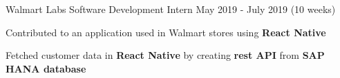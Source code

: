 


\begin{cventries}

  \cventry
    {Walmart Labs} %
    {\fontsize{14pt}{16pt} \selectfont Software Development Intern} %
    {May 2019 - July 2019} %
    {(10 weeks)} %
    {
      \begin{cvitems} %
        \item {Contributed to an application used in Walmart stores using {\bf React Native}}
        \item {Fetched customer data in {\bf React Native} by creating {\bf rest API} from {\bf SAP HANA database}}
      \end{cvitems}
    }
    
\end{cventries}



